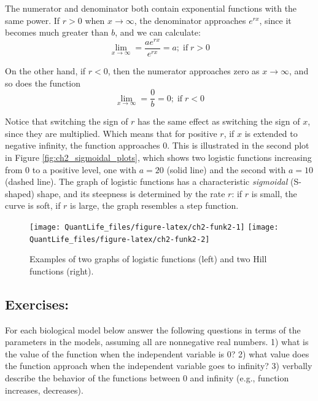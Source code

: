 \documentclass[
]{book}
\theoremstyle{definition}
\theoremstyle{definition}
\theoremstyle{definition}
\theoremstyle{remark}
\begin{document}
The numerator and denominator both contain exponential functions with the same power. If \(r>0\) when \(x \to \infty\), the denominator approaches \(e^{rx}\), since it becomes much greater than \(b\), and we can calculate:
\[  \lim_{x \to \infty}  =  \frac{a e^{rx} }{e^{rx}} = a; \; \mathrm{if} \; r>0 \]

On the other hand, if \(r<0\), then the numerator approaches zero as \(x \to \infty\), and so does the function
\[  \lim_{x \to \infty}  =  \frac{0}{b} = 0; \; \mathrm{if} \; r<0 \]

Notice that switching the sign of \(r\) has the same effect as switching the sign of \(x\), since they are multiplied. Which means that for positive \(r\), if \(x\) is extended to negative infinity, the function approaches 0. This is illustrated in the second plot in Figure \ref{fig:ch2_sigmoidal_plots}, which shows two logistic functions increasing from 0 to a positive level, one with \(a=20\) (solid line) and the second with \(a=10\) (dashed line). The graph of logistic functions has a characteristic \emph{sigmoidal} (S-shaped) shape, and its steepness is determined by the rate \(r\): if \(r\) is small, the curve is soft, if \(r\) is large, the graph resembles a step function.

\begin{figure}

{\centering \texttt{[image: QuantLife\_files/figure-latex/ch2-funk2-1]} \texttt{[image: QuantLife\_files/figure-latex/ch2-funk2-2]} 

}

\caption{Examples of two graphs of logistic functions (left) and two Hill functions (right).}\label{fig:ch2-funk2}
\end{figure}

\hypertarget{exercises-3}{%
\subsection{Exercises:}\label{exercises-3}}

For each biological model below answer the following questions in terms of the parameters in the models, assuming all are nonnegative real numbers. 1) what is the value of the function when the independent variable is 0? 2) what value does the function approach when the independent variable goes to infinity? 3) verbally describe the behavior of the functions between 0 and infinity (e.g., function increases, decreases).
\end{document}
